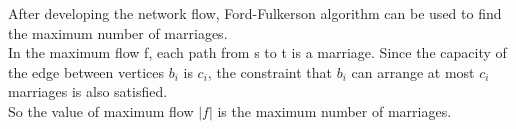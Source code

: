 \documentclass[a4paper]{article}
\begin{document}
After developing the network flow, Ford-Fulkerson algorithm can be used to find the maximum number of marriages.\\
In the maximum flow f, each path from s to t is a marriage. Since the capacity of the edge between vertices $b_i$ is $c_i$, the constraint that $b_i$ can arrange at most $c_i$ marriages is also satisfied.\\
So the value of maximum flow $|f|$ is the maximum number of marriages.\\
\end{document}
